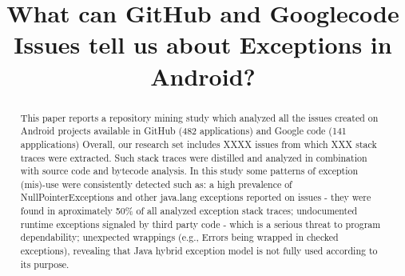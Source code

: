 \documentclass[conference]{IEEEtran}
\begin{document}

\title{ What can GitHub and Googlecode Issues tell us about Exceptions in Android? }







\author{
}

\newcommand{\todo}[1]{\textbf{TODO}\footnote{\textbf{TODO:} #1}}

\maketitle

\begin{abstract}

This paper reports a repository mining study which analyzed all the issues created on
 Android projects available in GitHub (482 applications) and Google code (141 appplications)
Overall, our research set includes XXXX issues from which XXX stack traces 
were extracted. Such stack traces were distilled and analyzed in 
combination with source code and bytecode analysis. In this study some patterns of exception
(mis)-use were consistently detected such as: a high prevalence of NullPointerExceptions and 
other java.lang exceptions reported on issues - they were found in aproximately 50\% of all analyzed 
exception stack traces; undocumented runtime exceptions signaled by third party code - which is a serious threat to program
dependability; unexpected wrappings (e.g., Errors being wrapped in checked exceptions), revealing that Java hybrid exception
model is not fully used according to its purpose.

\end{abstract}
\end{document}
